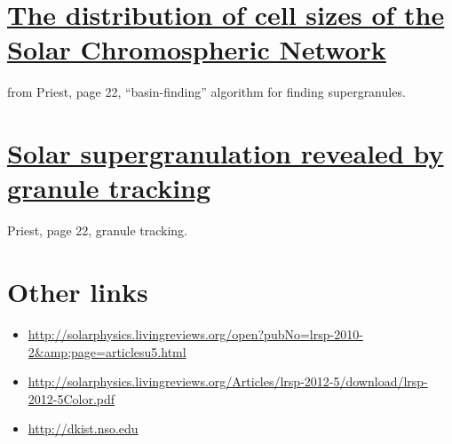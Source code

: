 \documentclass{article}
\begin{document}
\section{%
\href{http://cdsads.u-strasbg.fr/abs/1997ApJ...481..988H}
{The distribution of cell sizes of the Solar Chromospheric Network}}
from Priest, page 22, ``basin-finding'' algorithm for finding
supergranules.

\section{%
\href{http://cdsads.u-strasbg.fr/abs/2008A\%26A...479L..17R}
{Solar supergranulation revealed by granule tracking}}
Priest, page 22, granule tracking.

\section{Other links}
\begin{itemize}
    \item \url{http://solarphysics.livingreviews.org/open?pubNo=lrsp-2010-2&amp;page=articlesu5.html}
    \item \url{http://solarphysics.livingreviews.org/Articles/lrsp-2012-5/download/lrsp-2012-5Color.pdf}
    \item \url{http://dkist.nso.edu}
\end{itemize}

%
\end{document}
